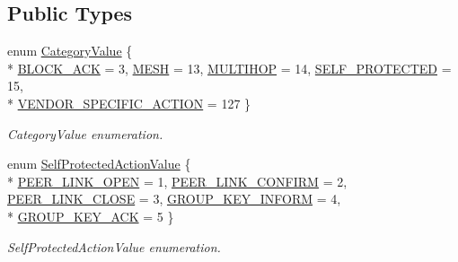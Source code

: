 \subsection*{Public Types}
\begin{DoxyCompactItemize}
\item 
enum \hyperlink{classns3_1_1WifiActionHeader_a5402becd11b4077f22d76c4d0d923358}{Category\+Value} \{ \\*
\hyperlink{classns3_1_1WifiActionHeader_a5402becd11b4077f22d76c4d0d923358ae1954449580715d3d737a12739923ef2}{B\+L\+O\+C\+K\+\_\+\+A\+CK} = 3, 
\hyperlink{classns3_1_1WifiActionHeader_a5402becd11b4077f22d76c4d0d923358a2324e47740ec462176e2b3dbbf50fc59}{M\+E\+SH} = 13, 
\hyperlink{classns3_1_1WifiActionHeader_a5402becd11b4077f22d76c4d0d923358a16a4194d2a8960fb5ec25ecd197cebf2}{M\+U\+L\+T\+I\+H\+OP} = 14, 
\hyperlink{classns3_1_1WifiActionHeader_a5402becd11b4077f22d76c4d0d923358a0d41e6327b2a9ae590e3020f378e40e4}{S\+E\+L\+F\+\_\+\+P\+R\+O\+T\+E\+C\+T\+ED} = 15, 
\\*
\hyperlink{classns3_1_1WifiActionHeader_a5402becd11b4077f22d76c4d0d923358a5eb709c107cc95e2862f5a6a341c2fe7}{V\+E\+N\+D\+O\+R\+\_\+\+S\+P\+E\+C\+I\+F\+I\+C\+\_\+\+A\+C\+T\+I\+ON} = 127
 \}\begin{DoxyCompactList}\small\item\em Category\+Value enumeration. \end{DoxyCompactList}
\item 
enum \hyperlink{classns3_1_1WifiActionHeader_a17cfd6c8f685a44e7b7b832cc9a53e83}{Self\+Protected\+Action\+Value} \{ \\*
\hyperlink{classns3_1_1WifiActionHeader_a17cfd6c8f685a44e7b7b832cc9a53e83a5d1c8a5ef38c884f951cfe32e03ca572}{P\+E\+E\+R\+\_\+\+L\+I\+N\+K\+\_\+\+O\+P\+EN} = 1, 
\hyperlink{classns3_1_1WifiActionHeader_a17cfd6c8f685a44e7b7b832cc9a53e83a89961b879d58204ada067ee8dbbde06e}{P\+E\+E\+R\+\_\+\+L\+I\+N\+K\+\_\+\+C\+O\+N\+F\+I\+RM} = 2, 
\hyperlink{classns3_1_1WifiActionHeader_a17cfd6c8f685a44e7b7b832cc9a53e83a809630e6f0c535ffe43ea071edacc7fd}{P\+E\+E\+R\+\_\+\+L\+I\+N\+K\+\_\+\+C\+L\+O\+SE} = 3, 
\hyperlink{classns3_1_1WifiActionHeader_a17cfd6c8f685a44e7b7b832cc9a53e83a60a15536ee8a0288a5bc4c45eac5d54f}{G\+R\+O\+U\+P\+\_\+\+K\+E\+Y\+\_\+\+I\+N\+F\+O\+RM} = 4, 
\\*
\hyperlink{classns3_1_1WifiActionHeader_a17cfd6c8f685a44e7b7b832cc9a53e83a72bc91fd576831ce897a5d0f9d426599}{G\+R\+O\+U\+P\+\_\+\+K\+E\+Y\+\_\+\+A\+CK} = 5
 \}\begin{DoxyCompactList}\small\item\em Self\+Protected\+Action\+Value enumeration. \end{DoxyCompactList}

\end{DoxyCompactItemize}

